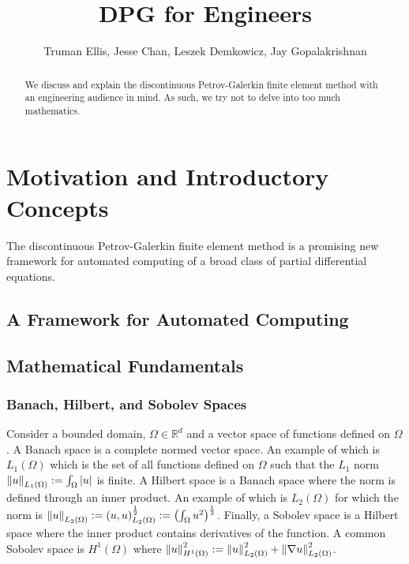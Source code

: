 \documentclass{article}
\title{DPG for Engineers}
\author{Truman Ellis, Jesse Chan, Leszek Demkowicz, Jay Gopalakrishnan}
\begin{document}
\maketitle

\begin{abstract}
We discuss and explain the discontinuous Petrov-Galerkin finite element method with an engineering audience in mind.
As such, we try not to delve into too much mathematics.
\end{abstract}

\section{Motivation and Introductory Concepts}
The discontinuous Petrov-Galerkin finite element method is a promising new framework 
for automated computing of a broad class of partial differential equations.

\subsection{A Framework for Automated Computing}

\subsection{Mathematical Fundamentals}

\subsubsection{Banach, Hilbert, and Sobolev Spaces}
Consider a bounded domain, $\Omega\in\mathbb{R}^d$ and a vector space of functions defined on $\Omega$.
A Banach space is a complete normed vector space.
An example of which is $L_1(\Omega)$ which is the set of all functions defined on $\Omega$ such that the $L_1$ norm
$\left\| u \right\|_{L_1(\Omega)}:=\int_\Omega|u|$ is finite.
A Hilbert space is a Banach space where the norm is defined through an inner product.
An example of which is $L_2(\Omega)$ for which the norm is
$\left\| u \right\|_{L_2(\Omega)}:=\left( u,u \right)_{L_2(\Omega)}^{\frac{1}{2}}:=\left( \int_\Omega u^2 \right)^{\frac{1}{2}}$.
Finally, a Sobolev space is a Hilbert space where the inner product contains derivatives of the function.
A common Sobolev space is $H^1(\Omega)$ where $\left\| u \right\|_{H^1(\Omega)}^2:=\left\| u \right\|_{L_2(\Omega)}^2+\left\| \nabla u \right\|_{L_2(\Omega)}^2$.
\end{document}

